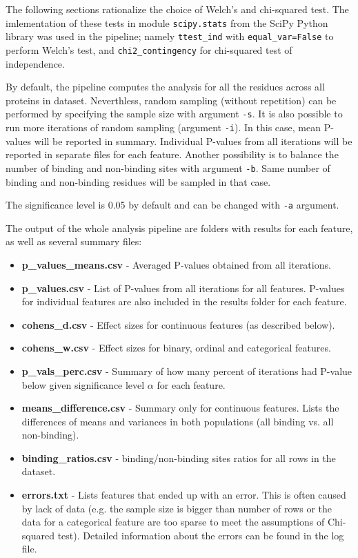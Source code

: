 The following sections rationalize the choice of Welch's and chi-squared test. The imlementation of these tests in module \texttt{scipy.stats} from the SciPy Python library \cite{scipy} was used in the pipeline; namely \texttt{ttest\_ind} with \texttt{equal\_var=False} to perform Welch's test, and \texttt{chi2\_contingency} for chi-squared test of independence.

By default, the pipeline computes the analysis for all the residues across all proteins in dataset. Neverthless, random sampling (without repetition) can be performed by specifying the sample size with argument \texttt{-s}. It is also possible to run more iterations of random sampling (argument \texttt{-i}). In this case, mean P-values will be reported in summary. Individual P-values from all iterations will be reported in separate files for each feature. Another possibility is to balance the number of binding and non-binding sites with argument \texttt{-b}. Same number of binding and non-binding residues will be sampled in that case.

The significance level is 0.05 by default and can be changed with \texttt{-a} argument.

The output of the whole analysis pipeline are folders with results for each feature, as well as several summary files:

\begin{itemize}
\item \textbf{p\_values\_means.csv} - Averaged P-values obtained from all iterations.
\item \textbf{p\_values.csv} - List of P-values from all iterations for all features. P-values for individual features are also included in the results folder for each feature.
\item \textbf{cohens\_d.csv} - Effect sizes for continuous features (as described below).
\item \textbf{cohens\_w.csv} - Effect sizes for binary, ordinal and categorical features.
\item \textbf{p\_vals\_perc.csv} - Summary of how many percent of iterations had P-value below given significance level $\alpha$ for each feature.
\item \textbf{means\_difference.csv} - Summary only for continuous features. Lists the differences of means and variances in both populations (all binding vs. all non-binding).
\item \textbf{binding\_ratios.csv} - binding/non-binding sites ratios for all rows in the dataset.
\item \textbf{errors.txt} - Lists features that ended up with an error. This is often caused by lack of data (e.g. the sample size is bigger than number of rows or the data for a categorical feature are too sparse to meet the assumptions of Chi-squared test). Detailed information about the errors can be found in the log file.
\end{itemize}

